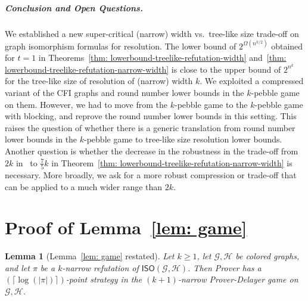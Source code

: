 \documentclass[10pt,a4paper]{article}
\newcommand{\graphG}{\mathcal{G}}
\newcommand{\graphH}{\mathcal{H}}
\newcommand{\ISO}{\mathsf{ISO}(\graphG, \graphH)}
\newtheorem{lemma}[theorem]{Lemma}
\begin{document}
\subparagraph{Conclusion and Open Questions.}
We established a new super-critical (narrow) width vs.~tree-like size trade-off on graph isomorphism formulas for resolution. The lower bound of $2^{\Omega(n^{k/2})}$ obtained for $t=1$ in Theorems~\ref{thm: lowerbound-treelike-refutation-width} and~\ref{thm: lowerbound-treelike-refutation-narrow-width} is close to the upper bound of $2^{n^k}$ for the tree-like size of resolution of (narrow) width $k$.
We exploited a compressed variant of the CFI graphs and round number lower bounds in the $k$-pebble game on them. However, we had to move from the $k$-pebble game to the $k$-pebble game with blocking, and reprove the round number lower bounds in this setting. This raises the question of whether there is a generic translation from round number lower bounds in the $k$-pebble game to tree-like size resolution lower bounds.
Another question is whether the decrease in the robustness in the trade-off from $2k$ in~\cite{RFJN024} to $\frac{7}{5}k$ in Theorem~\ref{thm: lowerbound-treelike-refutation-narrow-width} is necessary.
More broadly, we ask for a more robust compression or trade-off that can be applied to a much wider range than $2k$.
         
        
        
        
        \newpage


        
        \newpage
\appendix

%
\section{Proof of Lemma~\ref{lem: game}} \label{a: prover_delayer}

\begin{lemma}[Lemma~\ref{lem: game} restated]
Let $k\ge 1$, let $\graphG, \graphH$ be colored graphs, and let $\pi$ be a $k$-narrow refutation of $\ISO$. Then Prover has a $(\lceil \log(|\pi|)  \rceil)$-point strategy in the $(k+1)$-narrow Prover-Delayer game on $\graphG,\graphH$. 
\end{lemma}
\end{document}
